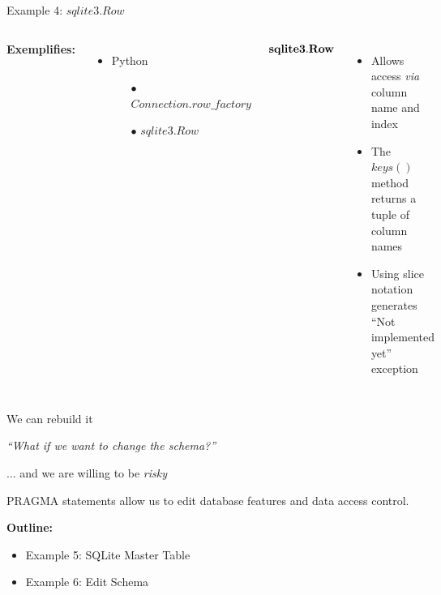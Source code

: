 \documentclass{beamer}
\begin{document}
\begin{frame}{Example 4: $sqlite3.Row$}

\begin{columns}
 \scriptsize

{\bf Exemplifies:}
\begin{itemize} \setlength\itemindent{-5pt}%
	\item Python
	\begin{itemize} \setlength\itemindent{-20pt} \scriptsize
		\item[$\bullet$] $Connection.row\_factory$
		\item[$\bullet$] $sqlite3.Row$
	\end{itemize}
\end{itemize} 

\vspace{12pt} $\bf sqlite3.Row$
\begin{itemize} \setlength\itemindent{-5pt}%
	\item Allows access \textit{via} column name and index
	\item The $keys()$ method returns a tuple of column names
	\item Using slice notation generates ``Not implemented yet'' exception
\end{itemize} 




\end{columns}
\end{frame}
\begin{frame}{We can rebuild it}

\textit{``What if we want to change the schema?''}

\vspace{3pt}\hspace{5cm} ... and we are willing to be \textit{risky}

\vspace{12pt} PRAGMA statements allow us to edit database features and data access control.


\vspace{12pt}
\large {\bf Outline:}
\begin{itemize}
\item Example 5: SQLite Master Table
\item Example 6: Edit Schema
\end{itemize}

\end{frame}
\end{document}
